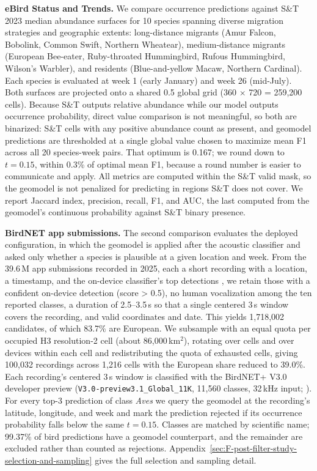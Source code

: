 \textbf{eBird Status and Trends.} We compare occurrence predictions against S\&T 2023 median abundance surfaces \citep{fink2024ebird} for 10 species spanning diverse migration strategies and geographic extents: long-distance migrants (Amur Falcon, Bobolink, Common Swift, Northern Wheatear), medium-distance migrants (European Bee-eater, Ruby-throated Hummingbird, Rufous Hummingbird, Wilson's Warbler), and residents (Blue-and-yellow Macaw, Northern Cardinal). Each species is evaluated at week 1 (early January) and week 26 (mid-July). Both surfaces are projected onto a shared 0.5\textdegree{} global grid (360 $\times$ 720 = 259,200 cells). Because S\&T outputs relative abundance while our model outputs occurrence probability, direct value comparison is not meaningful, so both are binarized: S\&T cells with any positive abundance count as present, and geomodel predictions are thresholded at a single global value chosen to maximize mean F1 across all 20 species-week pairs. That optimum is 0.167; we round down to $t = 0.15$, within 0.3\% of optimal mean F1, because a round number is easier to communicate and apply. All metrics are computed within the S\&T valid mask, so the geomodel is not penalized for predicting in regions S\&T does not cover. We report Jaccard index, precision, recall, F1, and AUC, the last computed from the geomodel's continuous probability against S\&T binary presence.

\textbf{BirdNET app submissions.} The second comparison evaluates the deployed configuration, in which the geomodel is applied after the acoustic classifier and asked only whether a species is plausible at a given location and week. From the 39.6\,M app submissions recorded in 2025, each a short recording with a location, a timestamp, and the on-device classifier's top detections \citep{wood2022machine}, we retain those with a confident on-device detection (score > 0.5), no human vocalization among the ten reported classes, a duration of 2.5--3.5\,s so that a single centered 3\,s window covers the recording, and valid coordinates and date. This yields 1,718,002 candidates, of which 83.7\% are European. We subsample with an equal quota per occupied H3 resolution-2 cell (about 86,000\,km$^2$), rotating over cells and over devices within each cell and redistributing the quota of exhausted cells, giving 100,032 recordings across 1,216 cells with the European share reduced to 39.0\%. Each recording's centered 3\,s window is classified with the BirdNET+ V3.0 developer preview (\texttt{V3.0-preview3.1\_Global\_11K}, 11,560 classes, 32\,kHz input; \citealp{lasseck2026birdnetv3}). For every top-3 prediction of class \emph{Aves} we query the geomodel at the recording's latitude, longitude, and week and mark the prediction rejected if its occurrence probability falls below the same $t = 0.15$. Classes are matched by scientific name; 99.37\% of bird predictions have a geomodel counterpart, and the remainder are excluded rather than counted as rejections. Appendix~\ref{sec:F-post-filter-study-selection-and-sampling} gives the full selection and sampling detail.

